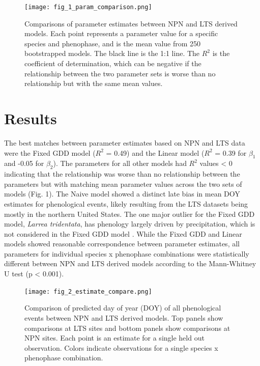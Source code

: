 \documentclass[fleqn,10pt,lineno]{wlpeerj} %
\begin{document}
\begin{figure}[]
	\centering
		\texttt{[image: fig\_1\_param\_comparison.png]}
	\caption{Comparisons of parameter estimates between NPN and LTS derived models. Each point represents a parameter value for a specific species and phenophase, and is the mean value from 250 bootstrapped models. The black line is the 1:1 line. The $R^2$ is the coefficient of determination, which can be negative if the relationship between the two parameter sets is worse than no relationship but with the same mean values.}
\end{figure}


\section*{Results}

The best matches between parameter estimates based on NPN and LTS data were the Fixed GDD model ($R^2$ = 0.49) and the Linear model ($R^2$ = 0.39 for $\beta_{1}$ and -0.05 for $\beta_{2}$). The parameters for all other models had $R^2$ values < 0 indicating that the relationship was worse than no relationship between the parameters but with matching mean parameter values across the two sets of models (Fig. 1). The Naive model showed a distinct late bias in mean DOY estimates for phenological events, likely resulting from the LTS datasets being mostly in the northern United States. The one major outlier for the Fixed GDD model, \textit{Larrea tridentata}, has phenology largely driven by precipitation, which is not considered in the Fixed GDD model \citep{beatley1974}. While the Fixed GDD and Linear models showed reasonable correspondence between parameter estimates, all parameters for individual species x phenophase combinations were statistically different between NPN and LTS derived models according to the Mann-Whitney U test (p < 0.001).

\begin{figure}
	\centering
		\texttt{[image: fig\_2\_estimate\_compare.png]}
	\caption{Comparison of predicted day of year (DOY) of all phenological events between NPN and LTS derived models. Top panels show comparisons at LTS sites and bottom panels show comparisons at NPN sites. Each point is an estimate for a single held out observation. Colors indicate observations for a single species x phenophase combination.}
\end{figure}
\end{document}
